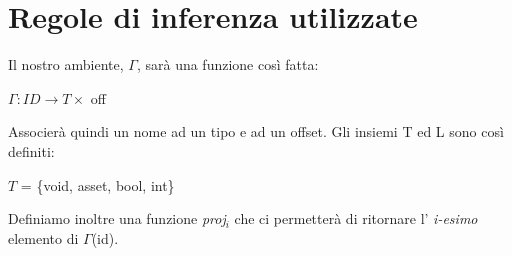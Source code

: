 \documentclass[12pt, a4paper]{report}
\begin{document}
\section{Regole di inferenza utilizzate}
Il nostro ambiente, $\Gamma$, sarà una funzione così fatta:
\begin{center}
    $\Gamma : ID \rightarrow T \times$ off
\end{center}
Associerà quindi un nome ad un tipo e ad un offset. Gli insiemi T ed L sono così definiti: 
\begin{center}
    $T$ = \{void, asset, bool, int\}\\
   
\end{center}
Definiamo inoltre una funzione \emph{proj$_i$} che ci permetterà di ritornare l' \emph{i-esimo} elemento di $\Gamma$(id).
\end{document}
